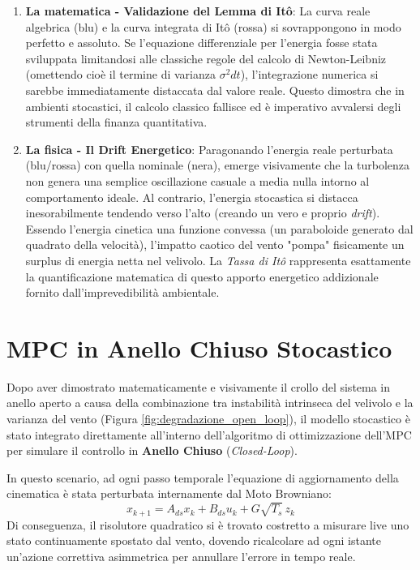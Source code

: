 \documentclass[12pt,a4paper]{article}
\begin{document}
\begin{enumerate}
    \item \textbf{La matematica - Validazione del Lemma di Itô}: La curva reale algebrica (blu) e la curva integrata di Itô (rossa) si sovrappongono in modo perfetto e assoluto. Se l'equazione differenziale per l'energia fosse stata sviluppata limitandosi alle classiche regole del calcolo di Newton-Leibniz (omettendo cioè il termine di varianza $\sigma^2 dt$), l'integrazione numerica si sarebbe immediatamente distaccata dal valore reale. Questo dimostra che in ambienti stocastici, il calcolo classico fallisce ed è imperativo avvalersi degli strumenti della finanza quantitativa.
    \item \textbf{La fisica - Il Drift Energetico}: Paragonando l'energia reale perturbata (blu/rossa) con quella nominale (nera), emerge visivamente che la turbolenza non genera una semplice oscillazione casuale a media nulla intorno al comportamento ideale. Al contrario, l'energia stocastica si distacca inesorabilmente tendendo verso l'alto (creando un vero e proprio \textit{drift}). Essendo l'energia cinetica una funzione convessa (un paraboloide generato dal quadrato della velocità), l'impatto caotico del vento "pompa" fisicamente un surplus di energia netta nel velivolo. La \textit{Tassa di Itô} rappresenta esattamente la quantificazione matematica di questo apporto energetico addizionale fornito dall'imprevedibilità ambientale.
\end{enumerate}



\section{ MPC in Anello Chiuso Stocastico}
Dopo aver dimostrato matematicamente e visivamente il crollo del sistema in anello aperto a causa della combinazione tra instabilità intrinseca del velivolo e la varianza del vento (Figura \ref{fig:degradazione_open_loop}), il modello stocastico è stato integrato direttamente all'interno dell'algoritmo di ottimizzazione dell'MPC per simulare il controllo in \textbf{Anello Chiuso} (\textit{Closed-Loop}).

In questo scenario, ad ogni passo temporale l'equazione di aggiornamento della cinematica è stata perturbata internamente dal Moto Browniano:
\begin{equation}
    x_{k+1} = A_{ds} x_k + B_{ds} u_k + G \sqrt{T_s} \, z_k
\end{equation}
Di conseguenza, il risolutore quadratico si è trovato costretto a misurare live uno stato continuamente spostato dal vento, dovendo ricalcolare ad ogni istante un'azione correttiva asimmetrica per annullare l'errore in tempo reale.
\end{document}
